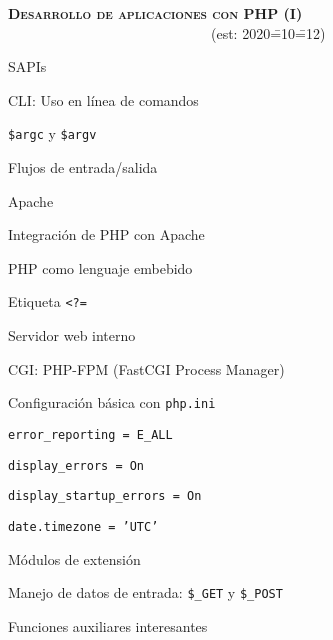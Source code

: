 \begin{longenum}
    \item \textbf{\textsc{Desarrollo de aplicaciones con PHP (I)}} \ \ \ \ \ \ \ \ \ \ \ \ \ \ \ \ \ \ \ \ \ \ \ \ \ \ \ \ \ (est: 2020\==10\==12)
    \begin{longenum}
        \item SAPIs
        \begin{longenum}
            \item CLI: Uso en línea de comandos
            \begin{longenum}
                \item \texttt{\$argc} y \texttt{\$argv}
                \item Flujos de entrada/salida \opcional\
            \end{longenum}
            \item Apache
            \begin{longenum}
                \item Integración de PHP con Apache \opcional\
                \item PHP como lenguaje embebido
                \item Etiqueta \texttt{<?=}
                \item Servidor web  interno
            \end{longenum}
            \item CGI: PHP-FPM (FastCGI Process Manager) \opcional\
            \item Configuración básica con \texttt{php.ini}
            \begin{longenum}
                \item \texttt{error\_reporting = E\_ALL}
                \item \texttt{display\_errors = On}
                \item \texttt{display\_startup\_errors = On}
                \item \texttt{date.timezone = 'UTC'}
            \end{longenum}
            \item Módulos de extensión
        \end{longenum}
        \item Manejo de datos de entrada: \texttt{\$\_GET} y \texttt{\$\_POST}
        \item Funciones auxiliares interesantes

\end{longenum}
\end{longenum}
